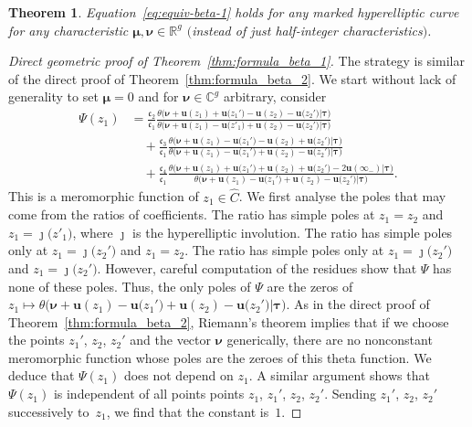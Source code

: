 \documentclass[pdftex]{sigma}
\numberwithin{equation}{section}
\newtheorem{Theorem}{Theorem}[section]
\begin{document}
\begin{Theorem}
Equation~\eqref{eq:equiv-beta-1} holds for any marked hyperelliptic curve for any characteristic $\bm{\mu},\bm{\nu} \in \mathbb{R}^g$ $($instead of just half-integer characteristics$)$.
\end{Theorem}
\begin{proof}[Direct geometric proof of Theorem~\ref{thm:formula_beta_1}]
 The strategy is similar of the direct proof of Theorem~\ref{thm:formula_beta_2}. We start without lack of generality to set $\bm{\mu} = 0$ and for $\bm{\nu} \in \mathbb{C}^g$ arbitrary, consider
 \begin{align*}
	 \Psi(z_1)
	 &= \frac{\mathfrak{c}_{2}}{\mathfrak{c}_{1}}\frac{\theta\bigl(\bm{\nu} + \bm{u}(z_1) + \bm{u}\bigl(z_1'\bigr) - \bm{u}(z_2) - \bm{u}\bigl(z_2'\bigr)\big|\bm{\tau}\bigr)
		}{\theta\bigl(\bm{\nu} + \bm{u}(z_1) - \bm{u}\bigl(z'_1\bigr) + \bm{u}(z_2) - \bm{u}\bigl(z_2'\bigr)\big|\bm{\tau}\bigr)}\\
	 & \quad +\frac{\mathfrak{c}_{3}}{\mathfrak{c}_{1}}\frac{\theta\bigl(\bm{\nu} + \bm{u}(z_1) - \bm{u}\bigl(z_1'\bigr) - \bm{u}(z_2) + \bm{u}\bigl(z_2'\bigr)\big|\bm{\tau}\bigr)
		}{\theta\bigl(\bm{\nu} + \bm{u}(z_1) - \bm{u}\bigl(z_1'\bigr) + \bm{u}(z_2) - \bm{u}\bigl(z_2'\bigr)\big|\bm{\tau}\bigr)}\\
	 & \quad +\frac{\mathfrak{c}_{4}}{\mathfrak{c}_{1}}\frac{\theta\bigl(\bm{\nu} + \bm{u}(z_1) + \bm{u}\bigl(z_1'\bigr)+\bm{u}(z_2)+\bm{u}\bigl(z_2'\bigr) - 2\bm{u}(\infty_-)\big|\bm{\tau}\bigr)}{\theta\bigl(\bm{\nu} + \bm{u}(z_1) - \bm{u}\bigl(z_1'\bigr) + \bm{u}(z_2) - \bm{u}\bigl(z_2'\bigr)\big|\bm{\tau}\bigr)}.
 \end{align*}
This is a meromorphic function of $z_1 \in \widehat{C}$. We first analyse the poles that may come from the ratios of coefficients. The ratio
  has simple poles at
 $z_1 = z_2$ and $z_1 = \jmath\bigl(z'_1\bigr)$, where $\jmath$ is the hyperelliptic involution. The
 ratio  has simple poles only at
 $z_1 = \jmath\bigl(z_2'\bigr)$ and $z_1 = z_2$. The ratio
  has simple poles only at
 $z_1 = \jmath\bigl(z_2'\bigr)$ and $z_1 = \jmath\bigl(z_2'\bigr)$. However, careful computation of the
 residues show that $\Psi$ has none of these poles. Thus, the only poles of $\Psi$ are the zeros of $z_1 \mapsto \theta\bigl(\bm{\nu} + \bm{u}(z_1) - \bm{u}\bigl(z_1'\bigr) + \bm{u}(z_2) - \bm{u}\bigl(z_2'\bigr)\big|\bm{\tau}\bigr)$. As in the direct proof of Theorem~\ref{thm:formula_beta_2}, Riemann's theorem implies that if we choose the points $z_1'$, $z_2$, $z_2'$ and the vector $\bm{\nu}$ generically, there are no nonconstant meromorphic function whose poles are the zeroes of this theta function. We deduce that $\Psi(z_1)$ does not depend on $z_1$. A similar argument shows that $\Psi(z_1)$ is independent of all points
 points $z_1$, $z_1'$, $z_2$, $z_2'$. Sending $z_1'$, $z_2$, $z_2'$ successively to~$z_1$, we find that the constant is~$1$.
\end{proof}
\end{document}
